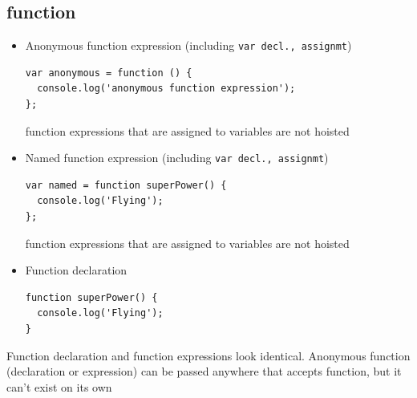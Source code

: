 \documentclass[a4paper, 12pt]{article}
\begin{document}
\subsection{function}
\begin{itemize}
\item Anonymous function expression (including \verb|var decl., assignmt|)
\begin{verbatim}
var anonymous = function () {
  console.log('anonymous function expression');
};
\end{verbatim}
function expressions that are assigned to variables are not hoisted

\item Named function expression (including \verb|var decl., assignmt|)
\begin{verbatim}
var named = function superPower() {
  console.log('Flying');
};
\end{verbatim}
function expressions that are assigned to variables are not hoisted

\item Function declaration
\begin{verbatim}
function superPower() {
  console.log('Flying');
}
\end{verbatim}

\end{itemize}
Function declaration and function expressions look identical. Anonymous function (declaration or expression) can be passed anywhere that accepts function, but it can't exist on its own
\end{document}
